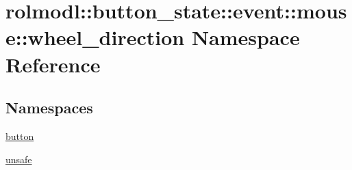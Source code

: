 \hypertarget{namespacerolmodl_1_1button__state_1_1event_1_1mouse_1_1wheel__direction}{}\section{rolmodl\+::button\+\_\+state\+::event\+::mouse\+::wheel\+\_\+direction Namespace Reference}
\label{namespacerolmodl_1_1button__state_1_1event_1_1mouse_1_1wheel__direction}
\subsection*{Namespaces}
\begin{DoxyCompactItemize}
\item 
 \mbox{\hyperlink{namespacerolmodl_1_1button__state_1_1event_1_1mouse_1_1wheel__direction_1_1button}{button}}
\item 
 \mbox{\hyperlink{namespacerolmodl_1_1button__state_1_1event_1_1mouse_1_1wheel__direction_1_1unsafe}{unsafe}}
\end{DoxyCompactItemize}
